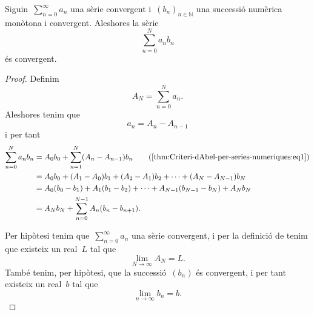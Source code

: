 \documentclass[../../main.tex]{subfiles}
\begin{document}
    \begin{theorem}
        \label{thm:Criteri-dAbel-per-series-numeriques}
        Siguin~\(\sum_{n=0}^{\infty}a_{n}\) una sèrie convergent i~\((b_{n})_{n\in\mathbb{N}}\) una successió numèrica monòtona i convergent.
        Aleshores la sèrie
        \[
            \sum_{n=0}^{N}a_{n}b_{n}
        \]
        és convergent.
    \end{theorem}
    \begin{proof}
        Definim
        \[
            A_{N}=\sum_{n=0}^{N}a_{n}.
        \]
        Aleshores tenim que
        \begin{equation}
            \label{thm:Criteri-dAbel-per-series-numeriques:eq1}
            a_{n}=A_{n}-A_{n-1}
        \end{equation}
        i per tant
        \begin{align*}
            \sum_{n=0}^{N}a_{n}b_{n}&=A_{0}b_{0}+\sum_{n=1}^{N}(A_{n}-A_{n-1})b_{n} \tag{\ref{thm:Criteri-dAbel-per-series-numeriques:eq1}}\\
            &=A_{0}b_{0}+(A_{1}-A_{0})b_{1}+(A_{2}-A_{1})b_{2}+\dots+(A_{N}-A_{N-1})b_{N} \\
            &=A_{0}(b_{0}-b_{1})+A_{1}(b_{1}-b_{2})+\dots+A_{N-1}(b_{N-1}-b_{N})+A_{N}b_{N} \\
            &=A_{N}b_{N}+\sum_{n=0}^{N-1}A_{n}(b_{n}-b_{n+1}).
        \end{align*}

        Per hipòtesi tenim que~\(\sum_{n=0}^{\infty}a_{n}\) una sèrie convergent, i per la definició de  tenim que existeix un real~\(L\) tal que
        \begin{equation}
            \label{thm:Criteri-dAbel-per-series-numeriques:eq2}
            \lim_{N\to\infty}A_{N}=L.
        \end{equation}
        També tenim, per hipòtesi, que la successió~\((b_{n})\) és convergent, i per tant existeix un real~\(b\) tal que %
        \begin{equation}
            \label{thm:Criteri-dAbel-per-series-numeriques:eq4}
            \lim_{n\to\infty}b_{n}=b.
        \end{equation}


\end{proof}
\end{document}

